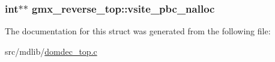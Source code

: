 \hypertarget{structgmx__reverse__top_aa499301b310f18446d4159d2b8b03fd7}{
\subsubsection[{vsite\-\_\-pbc\-\_\-nalloc}]{\setlength{\rightskip}{0pt plus 5cm}int$\ast$$\ast$ {\bf gmx\-\_\-reverse\-\_\-top\-::vsite\-\_\-pbc\-\_\-nalloc}}}\label{structgmx__reverse__top_aa499301b310f18446d4159d2b8b03fd7}


\-The documentation for this struct was generated from the following file\-:\begin{DoxyCompactItemize}
\item 
src/mdlib/\hyperlink{domdec__top_8c}{domdec\-\_\-top.\-c}\end{DoxyCompactItemize}
